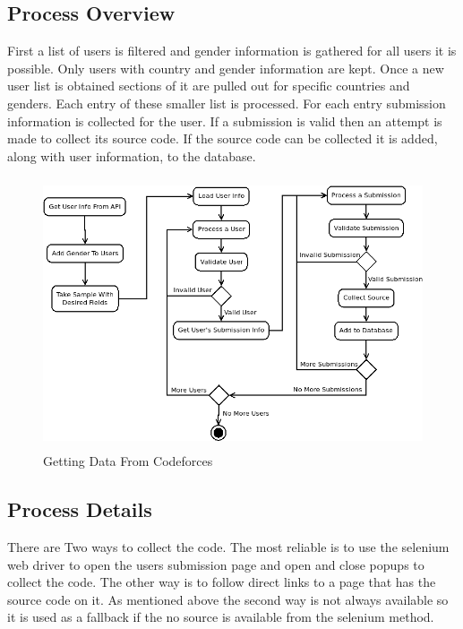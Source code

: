 \documentclass{article}
\begin{document}
\subsection{Process Overview}
First a list of users is filtered and gender information is gathered for all users it is possible. Only users with country and gender information are kept. Once a new user list is obtained sections of it are pulled out for specific countries and genders. Each entry of these smaller list is processed. For each entry submission information is collected for the user. If a submission is valid then an attempt is made to collect its source code. If the source code can be collected it is added, along with user information, to the database.

\begin{figure}[!h]
    \centering
    \includegraphics[height=8cm]{diagrams/cf_process.png}
    \caption{Getting Data From Codeforces}
\end{figure}


\subsection{Process Details}
There are Two ways to collect the code. The most reliable is to use the selenium web driver to open the users submission page and open and close popups to collect the code. The other way is to follow direct links to a page that has the source code on it. As mentioned above the second way is not always available so it is used as a fallback if the no source is available from the selenium method.
\end{document}
